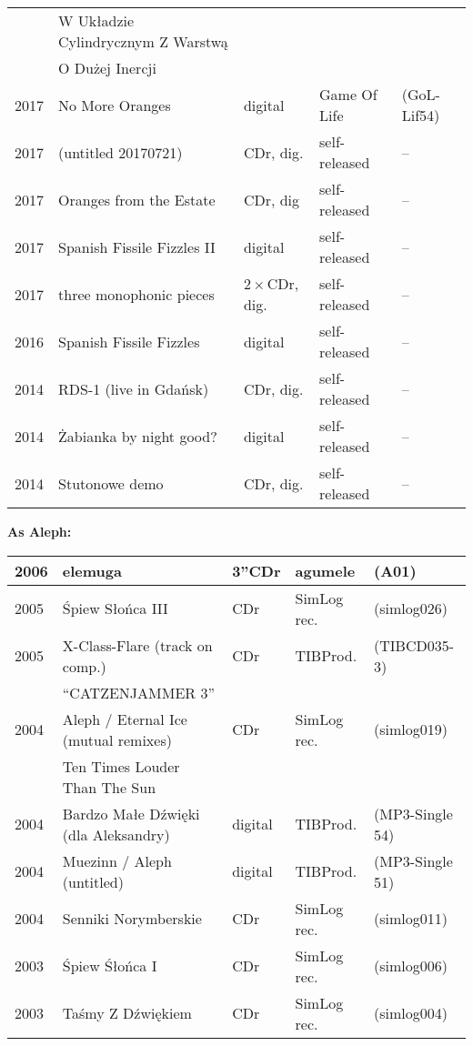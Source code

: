 \documentclass[a4paper]{article}
\begin{document}
\begin{tabularx}{\textwidth}{l l l l l}
     & W Układzie Cylindrycznym Z Warstwą & & & \\
     & O Dużej Inercji & & & \\
\hline
2017 & No More Oranges & digital & Game Of Life & (GoL-Lif54)\\
\hline
2017 & (untitled 20170721) & CDr, dig. & self-released & -- \\
\hline
2017 & Oranges from the Estate & CDr, dig & self-released & -- \\
\hline
2017 & Spanish Fissile Fizzles II & digital & self-released & -- \\
\hline
2017 & three monophonic pieces &  $2\times$CDr, dig. & self-released & -- \\
\hline
2016 & Spanish Fissile Fizzles & digital & self-released & -- \\
\hline
2014 & RDS-1 (live in Gdańsk) & CDr, dig. & self-released & -- \\
\hline
2014 & Żabianka by night good? & digital & self-released & -- \\
\hline
2014 & Stutonowe demo & CDr, dig. & self-released & --
\end{tabularx}

\vspace{11mm}

\textbf{As Aleph:}

\vspace{2mm}

\begin{tabularx}{\textwidth}{l l l l l}
\hline
2006 & elemuga & 3''CDr & agumele & (A01)\\
\hline
2005 & Śpiew Słońca III & CDr & SimLog rec. & (simlog026)\\
\hline
2005 & X-Class-Flare (track on comp.)& CDr & TIBProd. &  (TIBCD035-3)\\
     & ``CATZENJAMMER 3'' & & & \\
\hline
2004 & Aleph / Eternal Ice (mutual remixes) & CDr & SimLog rec. & (simlog019)\\
     & Ten Times Louder Than The Sun &  & & \\
\hline
2004 & Bardzo Małe Dźwięki (dla Aleksandry) & digital & TIBProd. & (MP3-Single 54)\\
\hline
2004 & Muezinn / Aleph  (untitled) & digital & TIBProd. & (MP3-Single 51) \\
\hline
2004 & Senniki Norymberskie & CDr & SimLog rec. & (simlog011) \\
\hline
2003 & Śpiew Śłońca I & CDr & SimLog rec. & (simlog006)\\
\hline
2003 & Taśmy Z Dźwiękiem & CDr & SimLog rec. & (simlog004)
\end{tabularx}
\end{document}
